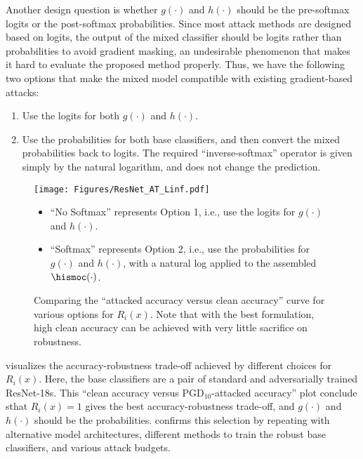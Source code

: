 \documentclass[11pt, letterpaper]{article}
\theoremstyle{plain}
\theoremstyle{definition}
\begin{document}
Another design question is whether $g (\cdot)$ and $h (\cdot)$ should be the pre-softmax logits or the post-softmax probabilities. Since most attack methods are designed based on logits, the output of the mixed classifier should be logits rather than probabilities to avoid gradient masking, an undesirable phenomenon that makes it hard to evaluate the proposed method properly. Thus, we have the following two options that make the mixed model compatible with existing gradient-based attacks:
\begin{enumerate}[leftmargin=6mm]
	\setlength\itemsep{1pt}
	\item Use the logits for both $g (\cdot)$ and $h (\cdot)$.
	\item Use the probabilities for both base classifiers, and then convert the mixed probabilities back to logits. The required ``inverse-softmax'' operator is given simply by the natural logarithm, and does not change the prediction.
\end{enumerate}

\begin{figure}[t]
	\centering
	\begin{minipage}{.56\textwidth}
		\texttt{[image: Figures/ResNet\_AT\_Linf.pdf]}
	\end{minipage}
	\begin{minipage}{.38\textwidth}
		\begin{itemize}[leftmargin=4mm]
			\setlength\itemsep{.8em}
			\item \small ``No Softmax'' represents Option 1, i.e., use the logits for $g (\cdot)$ and $h (\cdot)$. 
			\item \small ``Softmax'' represents Option 2, i.e., use the probabilities for $g (\cdot)$ and $h (\cdot)$, with a natural log applied to the assembled $\hismoc (\cdot)$. 
		\end{itemize}
	\end{minipage}
	\vspace{-2mm}
	\caption{Comparing the ``attacked accuracy versus clean accuracy'' curve for various options for $R_i (x)$. Note that with the best formulation, high clean accuracy can be achieved with very little sacrifice on robustness.}
	\label{fig:compare_R}
\end{figure}

 visualizes the accuracy-robustness trade-off achieved by different choices for $R_i (x)$. Here, the base classifiers are a pair of standard and adversarially trained ResNet-18s. This ``clean accuracy versus PGD$_{10}$-attacked accuracy'' plot conclude sthat $R_i (x) = 1$ gives the best accuracy-robustness trade-off, and $g (\cdot)$ and $h (\cdot)$ should be the probabilities.  confirms this selection by repeating  with alternative model architectures, different methods to train the robust base classifiers, and various attack budgets.
\end{document}

